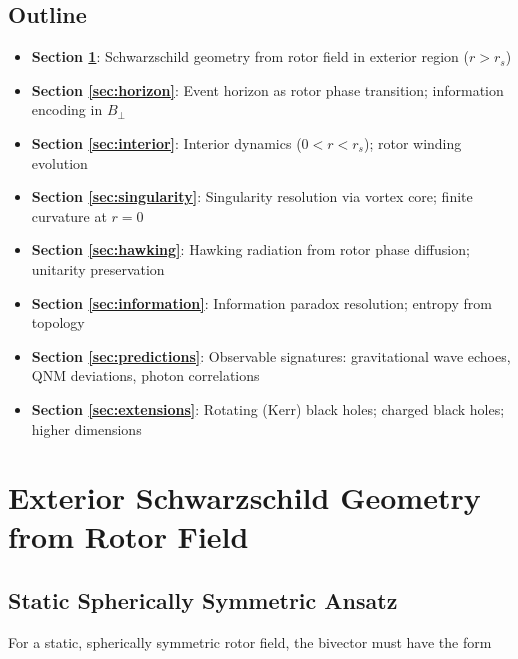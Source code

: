 \documentclass[11pt,a4paper]{article}
\numberwithin{equation}{section}
\theoremstyle{plain}
\theoremstyle{definition}
\theoremstyle{remark}
\begin{document}
\subsection{Outline}

\begin{itemize}
\item \textbf{Section \ref{sec:exterior}}: Schwarzschild geometry from rotor field in exterior region ($r > r_s$)

\item \textbf{Section \ref{sec:horizon}}: Event horizon as rotor phase transition; information encoding in $B_\perp$

\item \textbf{Section \ref{sec:interior}}: Interior dynamics ($0 < r < r_s$); rotor winding evolution

\item \textbf{Section \ref{sec:singularity}}: Singularity resolution via vortex core; finite curvature at $r=0$

\item \textbf{Section \ref{sec:hawking}}: Hawking radiation from rotor phase diffusion; unitarity preservation

\item \textbf{Section \ref{sec:information}}: Information paradox resolution; entropy from topology

\item \textbf{Section \ref{sec:predictions}}: Observable signatures: gravitational wave echoes, QNM deviations, photon correlations

\item \textbf{Section \ref{sec:extensions}}: Rotating (Kerr) black holes; charged black holes; higher dimensions
\end{itemize}

\section{Exterior Schwarzschild Geometry from Rotor Field}
\label{sec:exterior}

\subsection{Static Spherically Symmetric Ansatz}

For a static, spherically symmetric rotor field, the bivector must have the form
\end{document}
